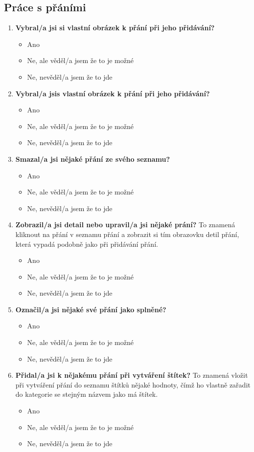 \subsection{Práce s přáními}
\begin{enumerate}
\item \textbf{Vybral/a jsi si vlastní obrázek k přání při jeho přidávání?}
		\begin{itemize}
		\item Ano
		\item Ne, ale věděl/a jsem že to je možné
		\item Ne, nevěděl/a jsem že to jde
		\end{itemize}
\item \textbf{Vybral/a jsis vlastní obrázek k přání při jeho přidávání?}
		\begin{itemize}
		\item Ano
		\item Ne, ale věděl/a jsem že to je možné
		\item Ne, nevěděl/a jsem že to jde
		\end{itemize}
\item \textbf{Smazal/a jsi nějaké přání ze svého seznamu?}
		\begin{itemize}
		\item Ano
		\item Ne, ale věděl/a jsem že to je možné
		\item Ne, nevěděl/a jsem že to jde
		\end{itemize}
\item \textbf{Zobrazil/a jsi detail nebo upravil/a jsi nějaké prání?} To znamená kliknout na přání v seznamu přání a zobrazit si tím obrazovku detil přání, která vypadá podobně jako při přidávání přání.
		\begin{itemize}
		\item Ano
		\item Ne, ale věděl/a jsem že to je možné
		\item Ne, nevěděl/a jsem že to jde
		\end{itemize}
\item \textbf{Označil/a jsi nějaké své přání jako splněné?}
		\begin{itemize}
		\item Ano
		\item Ne, ale věděl/a jsem že to je možné
		\item Ne, nevěděl/a jsem že to jde
		\end{itemize}
\item \textbf{Přidal/a jsi k nějakému přání při vytváření štítek?} To znamená vložit při vytváření přání do seznamu štítků nějaké hodnoty, čímž ho vlastně zařadit do kategorie se stejným názvem jako má štítek.
		\begin{itemize}
		\item Ano
		\item Ne, ale věděl/a jsem že to je možné
		\item Ne, nevěděl/a jsem že to jde
		\end{itemize}
\end{enumerate}

